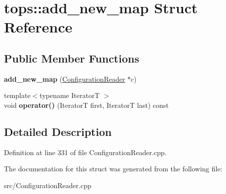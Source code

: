 \hypertarget{structtops_1_1add__new__map}{}\section{tops\+:\+:add\+\_\+new\+\_\+map Struct Reference}
\label{structtops_1_1add__new__map}
\subsection*{Public Member Functions}
\begin{DoxyCompactItemize}
\item 
\mbox{\label{structtops_1_1add__new__map_a91853c8ac807717eed526bda428cb854}} 
{\bfseries add\+\_\+new\+\_\+map} (\hyperlink{classtops_1_1ConfigurationReader}{Configuration\+Reader} $\ast$c)
\item 
\mbox{\label{structtops_1_1add__new__map_a0796c31a8a61a42722488d22d30977c2}} 
{\footnotesize template$<$typename IteratorT $>$ }\\void {\bfseries operator()} (IteratorT first, IteratorT last) const
\end{DoxyCompactItemize}


\subsection{Detailed Description}


Definition at line 331 of file Configuration\+Reader.\+cpp.



The documentation for this struct was generated from the following file\+:\begin{DoxyCompactItemize}
\item 
src/Configuration\+Reader.\+cpp\end{DoxyCompactItemize}
